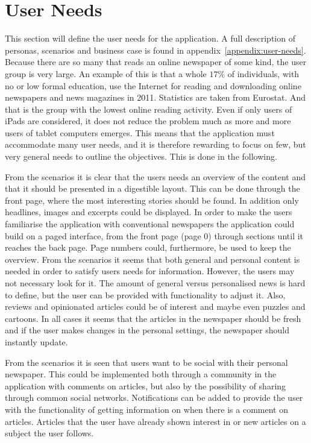 \section{User Needs}
This section will define the user needs for the application. A full description of personas, scenarios and business case is found in appendix~\vref{appendix:user-needs}.
\clearpage
Because there are so many that reads an online newspaper of some kind, the user group is very large. An example of this is that a whole $17\%$ of individuals, with no or low formal education, use the Internet for reading and downloading online newspapers and news magazines in 2011. Statistics are taken from Eurostat. And that is the group with the lowest online reading activity. Even if only users of iPads are considered, it does not reduce the problem much as more and more users of tablet computers emerges. This means that the application must accommodate many user needs, and it is therefore rewarding to focus on few, but very general needs to outline the objectives. This is done in the following.

From the scenarios it is clear that the users needs an overview of the content and that it should be presented in a digestible layout. This can be done through the front page, where the most interesting stories should be found. In addition only headlines, images and excerpts could be displayed. In order to make the users familiarise the application with conventional newspapers the application could build on a paged interface, from the front page (page $0$) through sections until it reaches the back page. Page numbers could, furthermore, be used to keep the overview. From the scenarios it seems that both general and personal content is needed in order to satisfy users needs for information. However, the users may not necessary look for it. The amount of general versus personalised news is hard to define, but the user can be provided with functionality to adjust it. Also, reviews and opinionated articles could be of interest and maybe even puzzles and cartoons. In all cases it seems that the articles in the newspaper should be fresh and if the user makes changes in the personal settings, the newspaper should instantly update.

From the scenarios it is seen that users want to be social with their personal newspaper. This could be implemented both through a community in the application with comments on articles, but also by the possibility of sharing through common social networks. Notifications can be added to provide the user with the functionality of getting information on when there is a comment on articles. Articles that the user have already shown interest in or new articles on a subject the user follows.

